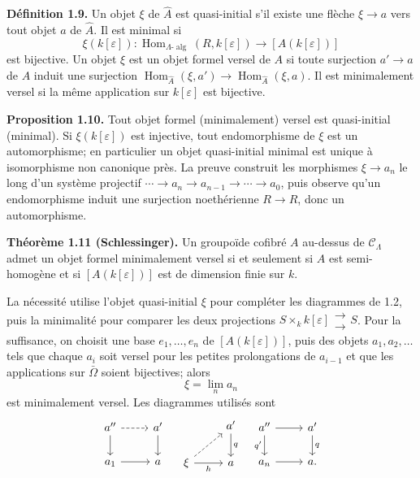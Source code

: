 \documentclass[11pt]{article}
\providecommand{\Hom}{\operatorname{Hom}}
\providecommand{\CL}{\mathcal C_\Lambda}
\providecommand{\alg}{\operatorname{alg}}
\begin{document}
\textbf{D\'efinition 1.9.} Un objet $\xi$ de $\widehat A$ est quasi-initial s'il existe une fl\`eche $\xi\to a$ vers tout objet $a$ de $\widehat A$. Il est minimal si
\[
 \xi(k[\varepsilon]):\Hom_{\Lambda\text{-}\alg}(R,k[\varepsilon])\to[A(k[\varepsilon])]
\]
est bijective. Un objet $\xi$ est un objet formel versel de $A$ si toute surjection $a'\to a$ de $A$ induit une surjection $\Hom_{\widehat A}(\xi,a')\to\Hom_{\widehat A}(\xi,a)$. Il est minimalement versel si la m\^eme application sur $k[\varepsilon]$ est bijective.

\textbf{Proposition 1.10.} Tout objet formel (minimalement) versel est quasi-initial (minimal). Si $\xi(k[\varepsilon])$ est injective, tout endomorphisme de $\xi$ est un automorphisme; en particulier un objet quasi-initial minimal est unique \`a isomorphisme non canonique pr\`es. La preuve construit les morphismes $\xi\to a_n$ le long d'un syst\`eme projectif $\cdots\to a_n\to a_{n-1}\to\cdots\to a_0$, puis observe qu'un endomorphisme induit une surjection noeth\'erienne $R\to R$, donc un automorphisme.

\textbf{Th\'eor\`eme 1.11 (Schlessinger).} Un groupo\"ide cofibr\'e $A$ au-dessus de $\CL$ admet un objet formel minimalement versel si et seulement si $A$ est semi-homog\`ene et si $[A(k[\varepsilon])]$ est de dimension finie sur $k$.

La n\'ecessit\'e utilise l'objet quasi-initial $\xi$ pour compl\'eter les diagrammes de 1.2, puis la minimalit\'e pour comparer les deux projections $S\times_k k[\varepsilon]\mathrel{\substack{\longrightarrow\\[-.6ex]\longrightarrow}} S$. Pour la suffisance, on choisit une base $e_1,\ldots,e_n$ de $[A(k[\varepsilon])]$, puis des objets $a_1,a_2,\ldots$ tels que chaque $a_i$ soit versel pour les petites prolongations de $a_{i-1}$ et que les applications sur $\bar\Omega$ soient bijectives; alors
\[
 \xi=\lim_n a_n
\]
est minimalement versel. Les diagrammes utilis\'es sont
\[
\begin{tikzcd}
 a'' \arrow[r,dashed] \arrow[d] & a' \arrow[d]\\
 a_1 \arrow[r] & a
\end{tikzcd}
\quad
\begin{tikzcd}
& a' \arrow[d,"q"]\\
\xi \arrow[r,"h"'] \arrow[ur,dashed] & a
\end{tikzcd}
\quad
\begin{tikzcd}
 a'' \arrow[r] \arrow[d,"q'"'] & a' \arrow[d,"q"]\\
 a_n \arrow[r] & a .
\end{tikzcd}
\]
\end{document}
